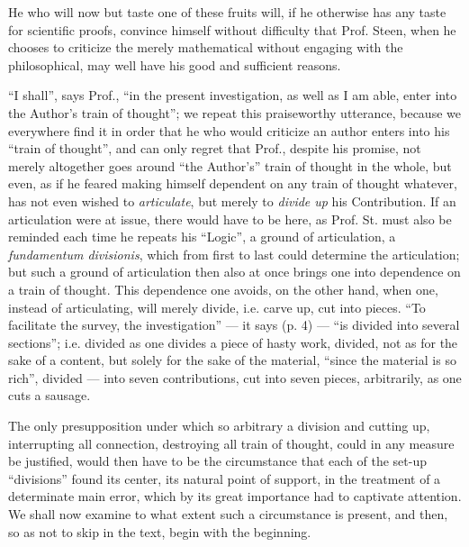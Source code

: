 \documentclass[12pt,a4paper,openany]{book}
\newcommand{\opage}[1]{\marginnote{\footnotesize\textit{[#1]}}}
\begin{document}
He who will now but taste one of these fruits
will, if he otherwise has any taste for scientific
proofs, convince himself without difficulty that Prof.
Steen, when he chooses to criticize the merely mathematical
without engaging with the philosophical, may well have his
good and sufficient reasons.

``I shall'', says Prof., ``in the present investigation, as well as I am able, enter into the Author's
train of thought''; we repeat this praiseworthy utterance, because
we everywhere find it in order that he who would criticize
an author enters into his ``train of thought'', and can
only regret that Prof., despite his promise, not merely
altogether goes around ``the Author's'' train of thought in the whole, but
even, as if he feared making himself dependent on any train of thought whatever, has not even wished to \emph{articulate}, but
merely to \emph{divide up} his Contribution. If an articulation were at issue, there would have to be here, as Prof. St. must also be
reminded each time he repeats his ``Logic'', a
ground of articulation, a \textit{fundamentum divisionis}, which from first
to last could determine the articulation; but such a ground of articulation then also at once brings one into dependence on
a train of thought. This dependence one avoids, on the other hand,
when one, instead of articulating, will merely divide, i.e. carve up,
cut into pieces. ``To facilitate the survey, the investigation''
\opage{18}\setcounter{footnote}{0}%
--- it says (p. 4) --- ``is divided into several sections''; i.e.
divided as one divides a piece of hasty work, divided, not as
for the sake of a content, but solely for the sake of the material, ``since the
material is so rich'', divided --- into seven contributions, cut into seven
pieces, arbitrarily, as one cuts a sausage.

The only presupposition under which so arbitrary a division and cutting up, interrupting all connection, destroying all train of thought, could
in any measure be justified, would then have to be the circumstance that each of the
set-up ``divisions'' found its center, its natural
point of support, in the treatment of a determinate main error, which
by its great importance had to captivate attention.
We shall now examine to what extent such a circumstance
is present, and then, so as not to skip in the text, begin
with the beginning.
\end{document}
